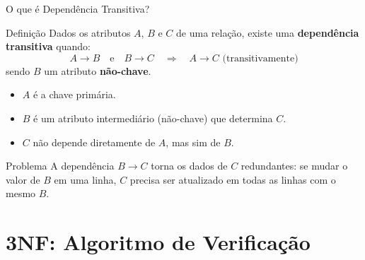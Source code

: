 \documentclass[9pt]{beamer}
\begin{document}
\begin{frame}{O que é Dependência Transitiva?}
  \begin{block}{Definição}
    Dados os atributos $A$, $B$ e $C$ de uma relação, existe uma \textbf{dependência transitiva} quando:
    \[
      A \to B \quad \text{e} \quad B \to C \quad \Rightarrow \quad A \to C \text{ (transitivamente)}
    \]
    sendo $B$ um atributo \textbf{não-chave}.
  \end{block}
  \vspace{0.4cm}
  \begin{itemize}
    \item $A$ é a chave primária.
    \item $B$ é um atributo intermediário (não-chave) que determina $C$.
    \item $C$ não depende diretamente de $A$, mas sim de $B$.
  \end{itemize}
  \vspace{0.3cm}
  \begin{alertblock}{Problema}
    A dependência $B \to C$ torna os dados de $C$ redundantes: se mudar o valor de $B$ em uma linha, $C$ precisa ser atualizado em todas as linhas com o mesmo $B$.
  \end{alertblock}
\end{frame}

\section{3NF: Algoritmo de Verificação}
\end{document}

